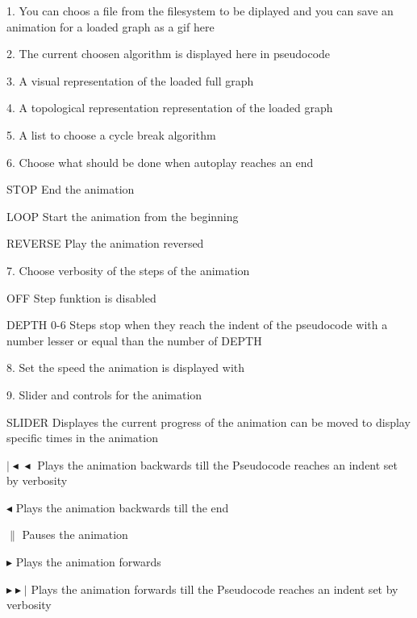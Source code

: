 \begin{list}{-}{}
\item[1.] You can choos a file from the filesystem to be diplayed and you can save an animation for a loaded graph as a gif here
\item[2.] The current choosen algorithm is displayed here in pseudocode
\item[3.] A visual representation of the loaded full graph
\item[4.] A topological representation representation of the loaded graph
\item[5.] A list to choose a cycle break algorithm
\item[6.] Choose what should be done when autoplay reaches an end
\begin{list}{-}{}
\item[STOP] End the animation
\item[LOOP] Start the animation from the beginning
\item[REVERSE] Play the animation reversed
\end{list}
\item[7.] Choose verbosity of the steps of the animation
\begin{list}{-}{}
\item[OFF] Step funktion is disabled
\item[DEPTH 0-6] Steps stop when they reach the indent of the pseudocode with a number lesser or equal than the number of DEPTH
\end{list}
\item[8.] Set the speed the animation is displayed with
\item[9.] Slider and controls for the animation
\begin{list}{-}{}
\item[SLIDER] Displayes the current progress of the animation can be moved to display specific times in the animation
\item[$\mid \! \blacktriangleleft \! \blacktriangleleft$ ] Plays the animation backwards till the Pseudocode reaches an indent set by verbosity
\item[$\blacktriangleleft$ ] Plays the animation backwards till the end
\item[\textbf{$\|$} ] Pauses the animation
\item[$ \blacktriangleright $ ] Plays the animation forwards
\item[$ \blacktriangleright \! \blacktriangleright \! \! \!|$ ]  Plays the animation forwards till the Pseudocode reaches an indent set by verbosity
\end{list}
\end{list}